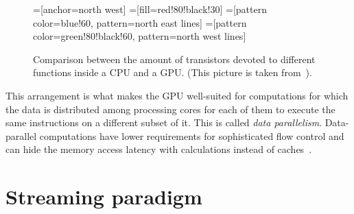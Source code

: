 \begin{figure}
  \centering
  =[anchor=north west]
  =[fill=red!80!black!30]
  =[pattern color=blue!60, pattern=north east lines]
  =[pattern color=green!80!black!60, pattern=north west lines]
  \label{fig:transistors}
  \caption[Comparison between CPU and GPU layout]{
    Comparison between the amount of transistors
    devoted to different functions inside a CPU and a GPU.
    (This picture is taken from~\cite[\S1]{cudaprog2}).
  }
\end{figure}

This arrangement is what makes the GPU
well-suited for computations
for which the data is distributed among processing cores
for each of them to execute the same instructions
on a different subset of it.
This is called \emph{data parallelism}.
Data-parallel computations have lower requirements
for sophisticated flow control
and can hide the memory access latency with calculations
instead of caches~\cite[\S1.2]{cudaprog2}.




\section{Streaming paradigm}

